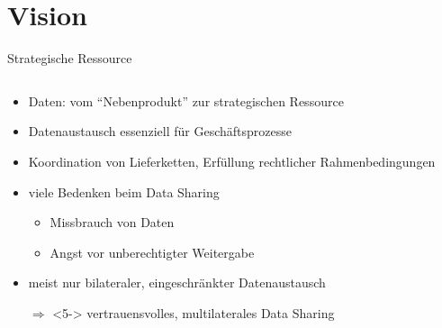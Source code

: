 
\section{Vision}


\begin{frame}{Strategische Ressource {\footnotesize\cite{mollerIndustrialDataEcosystems2024}}}
    \begin{columns}
        \begin{column}{0.7\textwidth}
            \begin{itemize}
                \item Daten: vom \enquote{Nebenprodukt} zur strategischen Ressource
                \item Datenaustausch essenziell für Geschäftsprozesse
                \item Koordination von Lieferketten, Erfüllung rechtlicher Rahmenbedingungen
                
                \item<2-> viele Bedenken beim Data Sharing
                \begin{itemize}
                    \item<2-> Missbrauch von Daten
                    \item<3-> Angst vor unberechtigter Weitergabe
                \end{itemize}

                
                \item<4-> meist nur bilateraler, eingeschränkter Datenaustausch
                
                \item[$\Rightarrow$]<5-> vertrauensvolles, multilaterales Data Sharing
            \end{itemize}
        \end{column}


\end{columns}
\end{frame}
